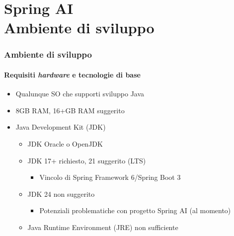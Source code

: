 \section{Spring AI\\{\small Ambiente di sviluppo}} %
\label{sec:dev-env}
%
\begin{frame}[t,fragile] \frametitle{Ambiente di sviluppo}
\framesubtitle{Requisiti \textit{hardware} e tecnologie di base}
    \begin{itemize}[leftmargin=20pt,align=right]
        \item[\alert{\faArrowCircleRight}] Qualunque SO che supporti sviluppo Java
        \item[\alert{\faArrowCircleRight}] \alert{8GB RAM}, 16+GB RAM suggerito
        \item[\alert{\faArrowCircleRight}] Java Development Kit (JDK)     
        \begin{itemize}[leftmargin=20pt,align=right]
            \item[\alert{\faArrowCircleRight}] JDK Oracle o OpenJDK
            \item[\alert{\faArrowCircleRight}] JDK \alert{17+} richiesto, \alert{21} suggerito (LTS)
            \begin{itemize}[leftmargin=20pt,align=right]
                \item[\alert{\faArrowCircleRight}] Vincolo di Spring Framework \alert{6}/Spring Boot \alert{3}
            \end{itemize}
            \item[\alert{\faExclamationTriangle}] JDK \alert{24 non} suggerito
            \begin{itemize}[leftmargin=20pt,align=right]
                \item[\alert{\faArrowCircleRight}] Potenziali problematiche con progetto Spring AI (al momento)
            \end{itemize}
            \item[\alert{\faExclamationTriangle}] Java Runtime Environment (JRE) \alert{non} sufficiente
        \end{itemize}
    \end{itemize}
\end{frame}
%
